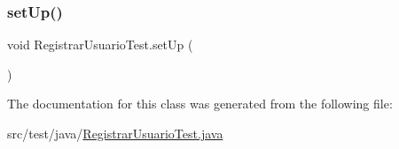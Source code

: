 \mbox{\label{class_registrar_usuario_test_a9ca8f19c0a72efcfb1e8dd2423a4c7f8}} 
\subsubsection{\texorpdfstring{setUp()}{setUp()}}
{\footnotesize\ttfamily void Registrar\+Usuario\+Test.\+set\+Up (\begin{DoxyParamCaption}{ }\end{DoxyParamCaption})}



The documentation for this class was generated from the following file\+:\begin{DoxyCompactItemize}
\item 
src/test/java/\mbox{\hyperlink{_registrar_usuario_test_8java}{Registrar\+Usuario\+Test.\+java}}\end{DoxyCompactItemize}
